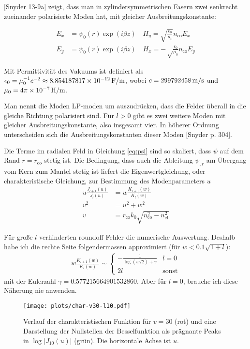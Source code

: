 \documentclass{article}
\newcommand{\nco}{n_\textrm{co}}
\newcommand{\rco}{r_\textrm{co}}
\newcommand{\ncl}{n_\textrm{cl}}
\begin{document}
[Snyder 13-9a] zeigt, dass man in zylindersymmetrischen Fasern zwei
senkrecht zueinander polarisierte Moden hat, mit gleicher
Ausbreitungskonstante:

\begin{align}
  E_x &= \psi_0(r) \exp(i\beta z)\quad H_y = \sqrt{\frac{\epsilon_0}{\mu_0}} \nco E_x\\
  E_y &= \psi_0(r) \exp(i\beta z)\quad H_x = -\sqrt\frac{\epsilon_0}{\mu_0} \nco E_y
\end{align}

Mit Permittivit\"at des Vakuums ist definiert als $\epsilon_0 =
\mu_0^{-1}c^{-2} \approx \unit[8.854 187 817 \times 10^{-12}]{F/m}$, wobei 
$c=\unit[299792458]{m/s}$ und
$\mu_0=
\unit[4\pi\times10^{-7}]{H/m}$.

Man nennt die Moden LP-moden um auszudr\"ucken, dass die Felder
\"uberall in die gleiche Richtung polarisiert sind. F\"ur $l>0$ gibt
es zwei weitere Moden mit gleicher Ausbreitungskonstante, also
insgesamt vier. In h\"oherer Ordnung unterscheiden sich die
Ausbreitungskonstanten dieser Moden [Snyder p. 304].

Die Terme im radialen Feld in Gleichung \eqref{eq:psi} sind so
skaliert, dass $\psi$ auf dem Rand $r=\rco$ stetig ist. Die Bedingung,
dass auch die Ableitung $\psi_{,r}$ am \"Ubergang vom Kern zum Mantel
stetig ist liefert die Eigenwertgleichung, oder charakteristische
Gleichung, zur Bestimmung des Modenparameters $u$
\begin{align}
  u\frac{J_{l+1}(u)}{J_l(u)}&=w\frac{K_{l+1}(w)}{K_l(w)}\\
  v^2 &= u^2+w^2\\
  v &= \rco k_0 \sqrt{\nco^2-\ncl^2}
\end{align}

F\"ur gro\ss e $l$ verhinderten roundoff Fehler die numerische
Auswertung. Deshalb habe ich die rechte Seite folgendermassen
approximiert (f\"ur $w<0.1 \sqrt{1+l}$):
\begin{align}
  w\frac{K_{l+1}(w)}{K_l(w)} \sim \begin{cases}
    -\frac{1}{\log(w/2)+\gamma} &l=0\\
    2l &\textrm{sonst}
    \end{cases}
\end{align}
mit der Eulerzahl $\gamma=0.577215664901532860$. Aber f\"ur $l=0$,
brauche ich diese N\"aherung nie anwenden.

\begin{figure}[!hbt]
  \centering
  \texttt{[image: plots/char-v30-l10.pdf]}
  \caption{Verlauf der charakteristischen Funktion f\"ur $v=30$ (rot)
    und eine Darstellung der Nullstellen der Besselfunktion als
    pr\"agnante Peaks in $\log|J_{10}(u)|$ (gr\"un). Die horizontale
    Achse ist $u$.}
  \label{fig:char}
\end{figure}
\end{document}
